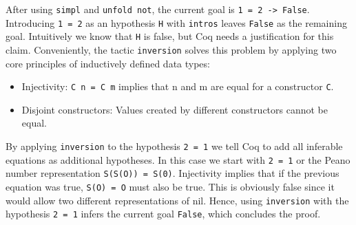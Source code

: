 \documentclass[paper = a4, fleqn, twoside]{scrreprt}
\newcommand{\coqinline}[1]{\texttt{#1}}
\begin{document}
After using \coqinline{simpl} and \coqinline{unfold not}, the current goal is \coqinline{1 = 2 -> False}. Introducing \coqinline{1 = 2} as an hypothesis \coqinline{H} with \coqinline{intros} leaves \coqinline{False} as the remaining goal. Intuitively we know that \coqinline{H} is false, but Coq needs a justification for this claim.
Conveniently, the tactic \coqinline{inversion} solves this problem by applying two core principles of inductively defined data types:
\begin{itemize}
	\item Injectivity: \coqinline{C n = C m} implies that n and m are equal for a constructor \coqinline{C}.
	\item Disjoint constructors: Values created by different constructors cannot be equal.
\end{itemize}
By applying \coqinline{inversion} to the hypothesis \coqinline{2 = 1} we tell Coq to add all inferable equations as additional hypotheses. In this case we start with \coqinline{2 = 1} or the Peano number representation \coqinline{S(S(O)) = S(0)}. Injectivity implies that if the previous equation was true, \coqinline{S(O) = O} must also be true. This is obviously false since it would allow two different representations of nil. Hence, using \coqinline{inversion} with the hypothesis \coqinline{2 = 1} infers the current goal \coqinline{False}, which concludes the proof.
\end{document}
